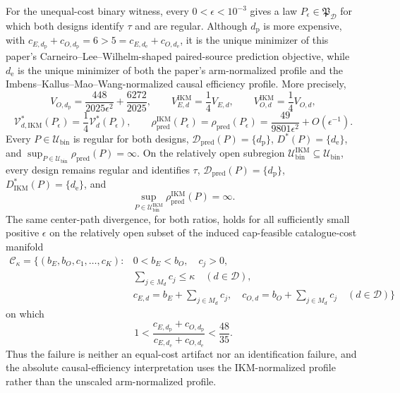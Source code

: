 For the unequal-cost binary witness, every \(0<\epsilon<10^{-3}\) gives a law \(P_\epsilon\in\mathfrak P_{\mathcal D}\) for which both designs identify \(\tau\) and are regular. Although \(d_{\mathrm p}\) is more expensive, with \(c_{E,d_{\mathrm p}}+c_{O,d_{\mathrm p}}=6>5=c_{E,d_{\mathrm e}}+c_{O,d_{\mathrm e}}\), it is the unique minimizer of this paper's Carneiro--Lee--Wilhelm-shaped paired-source prediction objective, while \(d_{\mathrm e}\) is the unique minimizer of both the paper's arm-normalized profile and the Imbens--Kallus--Mao--Wang-normalized causal efficiency profile. More precisely,
\[
V_{O,d_{\mathrm p}}=\frac{448}{2025\epsilon^2}+\frac{6272}{2025},
\qquad V_{E,d}^{\mathrm{IKM}}=\frac14V_{E,d},
\qquad V_{O,d}^{\mathrm{IKM}}=\frac14V_{O,d},
\]
\[
\mathcal V_{d,\mathrm{IKM}}^*(P_\epsilon)=\frac14\mathcal V_d^*(P_\epsilon),
\qquad
\rho_{\mathrm{pred}}^{\mathrm{IKM}}(P_\epsilon)=\rho_{\mathrm{pred}}(P_\epsilon)=\frac{49}{9801\epsilon^2}+O(\epsilon^{-1}).
\]
Every \(P\in\mathcal U_{\mathrm{bin}}\) is regular for both designs, \(\mathcal D_{\mathrm{pred}}(P)=\{d_{\mathrm p}\}\), \(D^*(P)=\{d_{\mathrm e}\}\), and \(\sup_{P\in\mathcal U_{\mathrm{bin}}}\rho_{\mathrm{pred}}(P)=\infty\). On the relatively open subregion \(\mathcal U_{\mathrm{bin}}^{\mathrm{IKM}}\subseteq\mathcal U_{\mathrm{bin}}\), every design remains regular and identifies \(\tau\), \(\mathcal D_{\mathrm{pred}}(P)=\{d_{\mathrm p}\}\), \(D_{\mathrm{IKM}}^*(P)=\{d_{\mathrm e}\}\), and
\[
\sup_{P\in\mathcal U_{\mathrm{bin}}^{\mathrm{IKM}}}\rho_{\mathrm{pred}}^{\mathrm{IKM}}(P)=\infty.
\]
The same center-path divergence, for both ratios, holds for all sufficiently small positive \(\epsilon\) on the relatively open subset of the induced cap-feasible catalogue-cost manifold
\[
\begin{aligned}
\mathcal C_\kappa=\biggl\{(b_E,b_O,c_1,\ldots,c_K):{}&0<b_E<b_O,\quad c_j>0,\\
&\sum_{j\in M_d}c_j\le\kappa\quad(d\in\mathcal D),\\
&c_{E,d}=b_E+\sum_{j\in M_d}c_j,\quad
c_{O,d}=b_O+\sum_{j\in M_d}c_j\quad(d\in\mathcal D)\biggr\}
\end{aligned}
\]
on which
\[
1<\frac{c_{E,d_{\mathrm p}}+c_{O,d_{\mathrm p}}}{c_{E,d_{\mathrm e}}+c_{O,d_{\mathrm e}}}<\frac{48}{35}.
\]
Thus the failure is neither an equal-cost artifact nor an identification failure, and the absolute causal-efficiency interpretation uses the IKM-normalized profile rather than the unscaled arm-normalized profile.